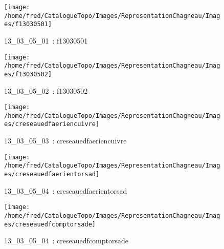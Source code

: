 \documentclass[12pt,titlepage]{book}
\begin{document}
\begin{figure}[h!]
  \hfill         %
  \begin{minipage}[t]{3cm}
    \begin{center}
      \texttt{[image: /home/fred/CatalogueTopo/Images/RepresentationChagneau/Images/f13030501]}
      \caption[~13\_03\_05\_01]{\small{13\_03\_05\_01~:} \tiny{f13030501}}\label{f13030501}
    \end{center}
  \end{minipage}
  \begin{minipage}[t]{3cm}
    \begin{center}
      \texttt{[image: /home/fred/CatalogueTopo/Images/RepresentationChagneau/Images/f13030502]}
      \caption[~13\_03\_05\_02]{\small{13\_03\_05\_02~:} \tiny{f13030502}}\label{f13030502}
    \end{center}
  \end{minipage}
  \begin{minipage}[t]{3cm}
    \begin{center}
      \texttt{[image: /home/fred/CatalogueTopo/Images/RepresentationChagneau/Images/creseauedfaeriencuivre]}
      \caption[~13\_03\_05\_03]{\small{13\_03\_05\_03~:} \tiny{creseauedfaeriencuivre}}\label{creseauedfaeriencuivre}
    \end{center}
  \end{minipage}
  \begin{minipage}[t]{3cm}
    \begin{center}
      \texttt{[image: /home/fred/CatalogueTopo/Images/RepresentationChagneau/Images/creseauedfaerientorsad]}
      \caption[~13\_03\_05\_04]{\small{13\_03\_05\_04~:} \tiny{creseauedfaerientorsad}}\label{creseauedfaerientorsad}
    \end{center}
  \end{minipage}
  \begin{minipage}[t]{3cm}
    \begin{center}
      \texttt{[image: /home/fred/CatalogueTopo/Images/RepresentationChagneau/Images/creseauedfcomptorsade]}
      \caption[~13\_03\_05\_04]{\small{13\_03\_05\_04~:} \tiny{creseauedfcomptorsade}}\label{creseauedfcomptorsade}
    \end{center}
  \end{minipage}

\end{figure}
\end{document}
